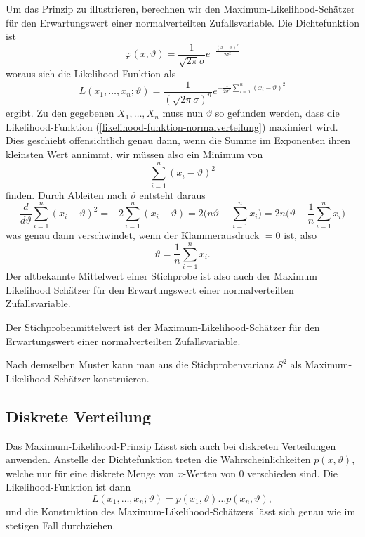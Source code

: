 Um das Prinzip zu illustrieren, berechnen wir den
Maximum-Likelihood-Schätzer für den Erwartungswert
einer normalverteilten Zufallsvariable.
Die Dichtefunktion ist 
\[
\varphi(x,\vartheta)
=
\frac1{\sqrt{2\pi}\sigma}e^{-\frac{(x-\vartheta)^2}{2\sigma^2}}
\]
woraus sich die Likelihood-Funktion als
\begin{equation}
L(x_1,\dots,x_n;\vartheta)
=
\frac1{(\sqrt{2\pi}\sigma)^n}e^{-\frac1{2\sigma^2}\sum_{i=1}^n(x_i-\vartheta)^2}
\label{likelihood-funktion-normalverteilung}
\end{equation}
ergibt.
Zu den gegebenen $X_1,\dots,X_n$ muss nun $\vartheta$ so gefunden
werden, dass die Likelihood-Funktion
(\ref{likelihood-funktion-normalverteilung}) maximiert wird.
Dies geschieht offensichtlich genau dann, wenn die Summe im Exponenten
ihren kleinsten Wert annimmt, wir müssen also ein Minimum von
\begin{equation}
\sum_{i=1}^n (x_i-\vartheta)^2
\end{equation}
finden.
Durch Ableiten nach $\vartheta$ entsteht daraus
\begin{equation}
\frac{d}{d\vartheta}
\sum_{i=1}^n (x_i-\vartheta)^2
=
-2\sum_{i=1}^n (x_i-\vartheta)
=
2\biggl(n\vartheta-\sum_{i=1}^nx_i\biggr)
=
2n\biggl(\vartheta-\frac1n\sum_{i=1}^nx_i\biggr)
\end{equation}
was genau dann verschwindet, wenn der Klammerausdruck $=0$ ist, also
\begin{equation}
\vartheta=\frac1n\sum_{i=1}^nx_i.
\end{equation}
Der altbekannte Mittelwert einer Stichprobe ist also auch der
Maximum Likelihood Schätzer für den Erwartungswert einer normalverteilten
Zufallsvariable.
\begin{satz}
Der Stichprobenmittelwert ist der Maximum-Likelihood-Schätzer
für den Erwartungswert einer normalverteilten Zufallsvariable.
\end{satz}
Nach demselben Muster kann man aus die Stichprobenvarianz $S^2$ als
Maximum-Likelihood-Schätzer konstruieren.

\subsection{Diskrete Verteilung}
Das Maximum-Likelihood-Prinzip Lässt sich auch bei diskreten Verteilungen
anwenden.
Anstelle der Dichtefunktion treten die Wahrscheinlichkeiten
$p(x, \vartheta)$, welche nur für eine diskrete Menge von $x$-Werten
von $0$ verschieden sind.
Die Likelihood-Funktion ist dann
\begin{equation}
L(x_1,\dots,x_n;\vartheta)=p(x_1,\vartheta)\dots p(x_n,\vartheta),
\label{likelihood-funktion-diskret}
\end{equation}
und die Konstruktion des Maximum-Likelihood-Schätzers lässt sich genau
wie im stetigen Fall durchziehen.

